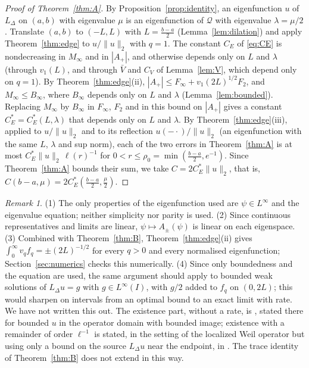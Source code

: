 \documentclass[11pt]{amsart}
\newcommand{\LD}{L_\Delta}
\theoremstyle{definition}
\theoremstyle{remark}
\newtheorem{remark}[theorem]{Remark}
\numberwithin{equation}{section}
\begin{document}
\begin{proof}[Proof of Theorem~\ref{thm:A}]
By Proposition~\ref{prop:identity}, an eigenfunction $u$ of $\LD$ on $(a,b)$ with eigenvalue $\mu$ is an eigenfunction of $\mathcal Q$ with eigenvalue $\lambda=\mu/2$. Translate $(a,b)$ to $(-L,L)$ with $L=\frac{b-a}2$ (Lemma~\ref{lem:dilation}) and apply Theorem~\ref{thm:edge} to $u/\|u\|_2$ with $q=1$. The constant $C_E$ of \eqref{eq:CE} is nondecreasing in $M_\infty$ and in $|A_+|$, and otherwise depends only on $L$ and $\lambda$ (through $v_1(L)$, and through $\bar V$ and $C_V$ of Lemma~\ref{lem:V}, which depend only on $q=1$). By Theorem~\ref{thm:edge}(ii), $|A_+|\le F_\infty+v_1(2L)^{1/2}F_2$, and $M_\infty\le B_\infty$, where $B_\infty$ depends only on $L$ and $\lambda$ (Lemma~\ref{lem:bounded}). Replacing $M_\infty$ by $B_\infty$ in $F_\infty$, $F_2$ and in this bound on $|A_+|$ gives a constant $C_E^*=C_E^*(L,\lambda)$ that depends only on $L$ and $\lambda$. By Theorem~\ref{thm:edge}(iii), applied to $u/\|u\|_2$ and to its reflection $u(-\cdot)/\|u\|_2$ (an eigenfunction with the same $L$, $\lambda$ and sup norm), each of the two errors in Theorem~\ref{thm:A} is at most $C_E^*\|u\|_2\,\ell(r)^{-1}$ for $0<r\le\rho_0=\min(\frac{b-a}2,e^{-1})$. Since Theorem~\ref{thm:A} bounds their sum, we take $C=2C_E^*\|u\|_2$, that is, $C(b-a,\mu)=2C_E^*(\frac{b-a}2,\frac\mu2)$.
\end{proof}

\begin{remark}\label{rem:linear}
(1) The only properties of the eigenfunction used are $\psi\in L^\infty$ and the eigenvalue equation; neither simplicity nor parity is used. (2) Since continuous representatives and limits are linear, $\psi\mapsto A_\pm(\psi)$ is linear on each eigenspace. (3) Combined with Theorem~\ref{thm:B}, Theorem~\ref{thm:edge}(ii) gives $\int_0^\infty v_qf_q=\pm(2L)^{-1/2}$ for every $q>0$ and every normalised eigenfunction; Section~\ref{sec:numerics} checks this numerically. (4) Since only boundedness and the equation are used, the same argument should apply to bounded weak solutions of $\LD u=g$ with $g\in L^\infty(I)$, with $g/2$ added to $f_q$ on $(0,2L)$; this would sharpen \cite[Thms.~1.1--1.2]{HLS25} on intervals from an optimal bound to an exact limit with rate. We have not written this out. The existence part, without a rate, is \cite[\S3.3]{BT26}, stated there for bounded $u$ in the operator domain with bounded image; existence with a remainder of order $\ell^{-1}$ is stated, in the setting of the localized Weil operator but using only a bound on the source $\LD u$ near the endpoint, in \cite[PL-329]{Mathia26}. The trace identity of Theorem~\ref{thm:B} does not extend in this way.
\end{remark}
\end{document}
